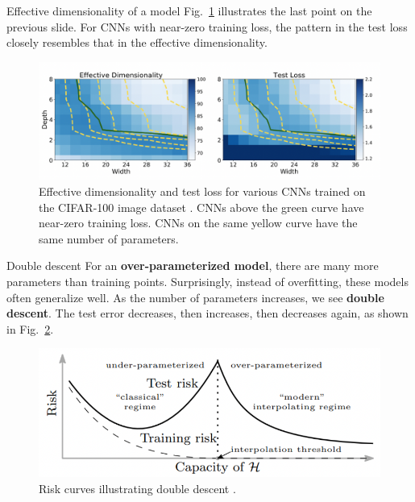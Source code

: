 \documentclass{beamer}
\begin{document}
\begin{frame}{Effective dimensionality of a model}
    Fig.~\ref{fig:effective_dimensionality_and_test_loss} illustrates the last point on the previous slide. For CNNs with near-zero training loss, the pattern in the test loss closely resembles that in the effective dimensionality.
    \begin{figure}
        \centering
        \includegraphics[width=\textwidth]{effective_dimensionality_and_test_loss}
        \caption{Effective dimensionality and test loss for various CNNs trained on the CIFAR-100 image dataset \cite{pml2Book}. CNNs above the green curve have near-zero training loss. CNNs on the same yellow curve have the same number of parameters.}
        \label{fig:effective_dimensionality_and_test_loss}
    \end{figure}    
\end{frame}

\begin{frame}{Double descent}
    For an \textbf{over-parameterized model}, there are many more parameters than training points. Surprisingly, instead of overfitting, these models often generalize well. As the number of parameters increases, we see \textbf{double descent}. The test error decreases, then increases, then decreases again, as shown in Fig.~\ref{fig:double_descent}.
    
    \begin{figure}
        \centering
        \includegraphics[width=\textwidth]{double_descent}
        \caption{Risk curves illustrating double descent \cite{pml2Book}.}
        \label{fig:double_descent}
    \end{figure}
\end{frame}
\end{document}
